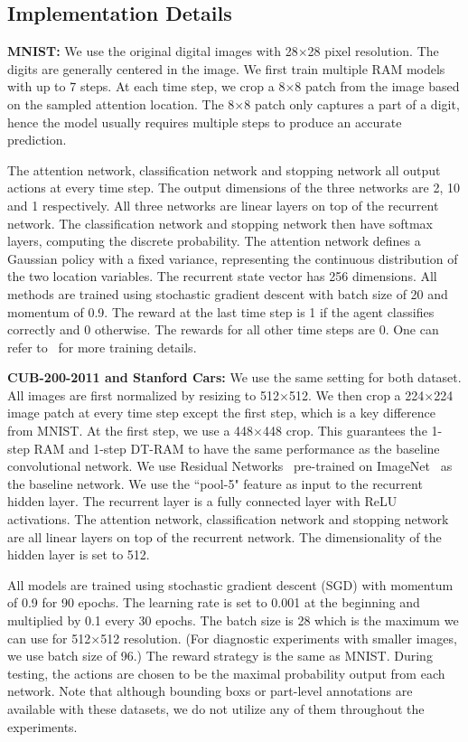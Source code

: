 \documentclass[10pt,twocolumn,letterpaper]{article}
\begin{document}
\subsection{Implementation Details}

{\bf MNIST:} We use the original digital images with 28$\times$28 pixel resolution.
The digits are generally centered in the image.
We first train multiple RAM models with up to 7 steps.
At each time step, we crop a 8$\times$8 patch from the image based on the sampled attention location.
The 8$\times$8 patch only captures a part of a digit, hence the model usually requires multiple steps to produce an accurate prediction.

The attention network, classification network and stopping network all output actions at every time step.
The output dimensions of the three networks are 2, 10 and 1 respectively.
All three networks are linear layers on top of the recurrent network.
The classification network and stopping network then have softmax layers, computing the discrete probability.
The attention network defines a Gaussian policy with a fixed variance, representing the continuous distribution of the two location variables.
The recurrent state vector has 256 dimensions.
All methods are trained using stochastic gradient descent with batch size of 20 and momentum of 0.9.
The reward at the last time step is 1 if the agent classifies correctly and 0 otherwise.
The rewards for all other time steps are 0.
One can refer to~\cite{mnih2014recurrent} for more training details.

{\bf CUB-200-2011 and Stanford Cars:} We use the same setting for both dataset.
All images are first normalized by resizing to 512$\times$512.
We then crop a 224$\times$224 image patch at every time step except the first step, which is a key difference from MNIST.
At the first step, we use a 448$\times$448 crop.
This guarantees the 1-step RAM and 1-step DT-RAM to have the same performance as the baseline convolutional network.
We use Residual Networks~\cite{he2016deep} pre-trained on ImageNet~\cite{deng2009imagenet} as the baseline network.
We use the ``pool-5" feature as input to the recurrent hidden layer.
The recurrent layer is a fully connected layer with ReLU activations.
The attention network, classification network and stopping network are all linear layers on top of the recurrent network.
The dimensionality of the hidden layer is set to 512.

All models are trained using stochastic gradient descent (SGD) with momentum of 0.9 for 90 epochs.
The learning rate is set to 0.001 at the beginning and multiplied by 0.1 every 30 epochs.
The batch size is 28 which is the maximum we can use for 512$\times$512 resolution.
(For diagnostic experiments with smaller images, we use batch size of 96.)
The reward strategy is the same as MNIST.
During testing, the actions are chosen to be the maximal probability output from each network.
Note that although bounding boxs or part-level annotations are available with these datasets, we do not utilize any of them throughout the experiments.
\end{document}
